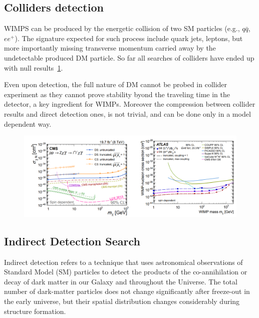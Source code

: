 \subsection{Colliders detection}
\label{subsec:collider}

WIMPS can be produced by the energetic collision of two SM particles (e.g., $q\bar{q}$, $ee^+$). The signature expected for such process include quark jets, leptons, but more importantly missing transverse momentum carried away by the undetectable produced DM particle. So far all searches of colliders have ended up with null results~\ref{fig:ColliderLimit}.  

Even upon detection, the full nature of DM cannot be probed in collider experiment as they cannot prove stability byond the traveling time in the detector, a key ingredient for WIMPs. Moreover the compression between collider results and direct detection ones, is not trivial, and can be done only in a model dependent way.
\begin{figure}[]
	\centering
	\includegraphics[width=\textwidth]{figs/ColliderLimit.png}
	\label{fig:ColliderLimit}
\end{figure}  

\subsection{Indirect Detection Search}
\label{subsec:indirect}
Indirect detection refers to a technique that uses astronomical observations
of Standard Model (SM) particles to detect the products of the co-annihilation or decay of dark matter in our Galaxy and throughout the Universe. The total number of dark-matter particles does not change significantly after freeze-out in the early universe, but their spatial distribution changes considerably during structure formation. 

